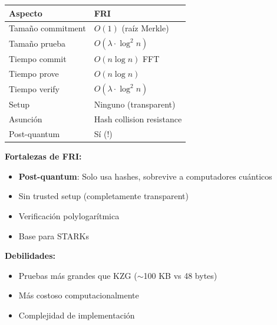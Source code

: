 \documentclass[11pt,a4paper,twoside,openright]{book}
\theoremstyle{definition}
\theoremstyle{plain}
\theoremstyle{remark}
\begin{document}
\begin{center}
\end{center}

\begin{center}
\begin{tabular}{ll}
\toprule
\textbf{Aspecto} & \textbf{FRI} \\
\midrule
Tamaño commitment & $O(1)$ (raíz Merkle) \\
Tamaño prueba & $O(\lambda \cdot \log^2 n)$ \\
Tiempo commit & $O(n \log n)$ FFT \\
Tiempo prove & $O(n \log n)$ \\
Tiempo verify & $O(\lambda \cdot \log^2 n)$ \\
Setup & Ninguno (transparent) \\
Asunción & Hash collision resistance \\
Post-quantum & Sí (!) \\
\bottomrule
\end{tabular}
\end{center}

\begin{keyidea}
\textbf{Fortalezas de FRI:}
\begin{itemize}
    \item \textbf{Post-quantum}: Solo usa hashes, sobrevive a computadores cuánticos
    \item Sin trusted setup (completamente transparent)
    \item Verificación polylogarítmica
    \item Base para STARKs
\end{itemize}

\textbf{Debilidades:}
\begin{itemize}
    \item Pruebas más grandes que KZG ($\sim$100 KB vs 48 bytes)
    \item Más costoso computacionalmente
    \item Complejidad de implementación
\end{itemize}
\end{keyidea}
\end{document}
